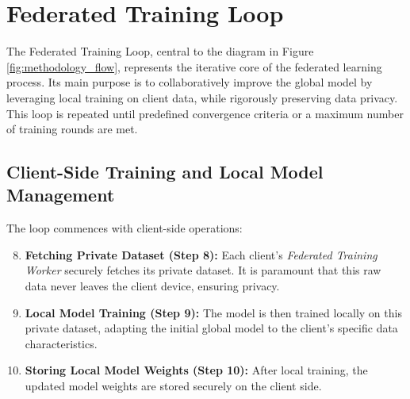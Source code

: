 \section{Federated Training Loop}
\label{sec:training_loop}

The Federated Training Loop, central to the diagram in Figure \ref{fig:methodology_flow}, represents the iterative core of the federated learning process. Its main purpose is to collaboratively improve the global model by leveraging local training on client data, while rigorously preserving data privacy. This loop is repeated until predefined convergence criteria or a maximum number of training rounds are met.

\subsection{Client-Side Training and Local Model Management}
\label{ssec:client_training}
The loop commences with client-side operations:
\begin{enumerate}
    \setcounter{enumi}{7} %
    \item \textbf{Fetching Private Dataset (Step 8):} Each client's \textit{Federated Training Worker} securely fetches its private dataset. It is paramount that this raw data never leaves the client device, ensuring privacy.
    \item \textbf{Local Model Training (Step 9):} The model is then trained locally on this private dataset, adapting the initial global model to the client's specific data characteristics.
    \item \textbf{Storing Local Model Weights (Step 10):} After local training, the updated model weights are stored securely on the client side.
\end{enumerate}

